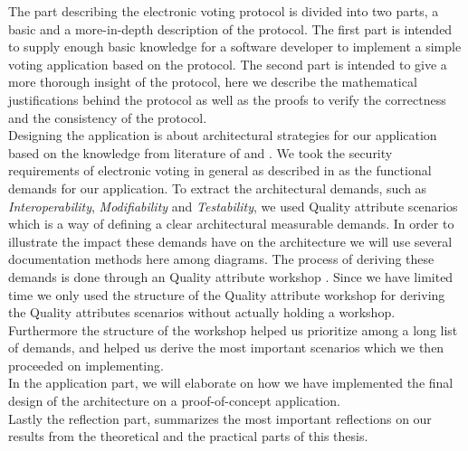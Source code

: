 \noindent
The part describing the electronic voting protocol is divided into two parts, a basic and a more-in-depth description of the protocol. The first part is intended to supply enough basic knowledge for a software developer to implement a simple voting application based on the protocol. The second part is intended to give a more thorough insight of the protocol, here we describe the mathematical justifications behind the protocol as well as the proofs to verify the correctness and the consistency of the protocol. \\


\noindent
Designing the application is about architectural strategies for our application based on the knowledge from literature of \cite{Bass} and \cite{Baerbak10}. We took the security requirements of electronic voting in general as described in \cite{Cet09} as the functional demands for our application. To extract the architectural demands, such as \textit{Interoperability}, \textit{Modifiability} and \textit{Testability}, we used Quality attribute scenarios which is a way of defining a clear architectural measurable demands. In order to illustrate the impact these demands have on the architecture we will use several documentation methods here among diagrams. The process of deriving these demands is done through an Quality attribute workshop \cite{BarbacciQualityAttribute2003}. Since we have limited time we only used the structure of the Quality attribute workshop for deriving the Quality attributes scenarios without actually holding a workshop. Furthermore the structure of the workshop helped us prioritize among a long list of demands, and helped us derive the most important scenarios which we then proceeded on implementing.\\


\noindent
In the application part, we will elaborate on how we have implemented the final design of the architecture on a proof-of-concept application. \\

\noindent
Lastly the reflection part, summarizes the most important reflections on our results from the theoretical and the practical parts of this thesis. 



  


 